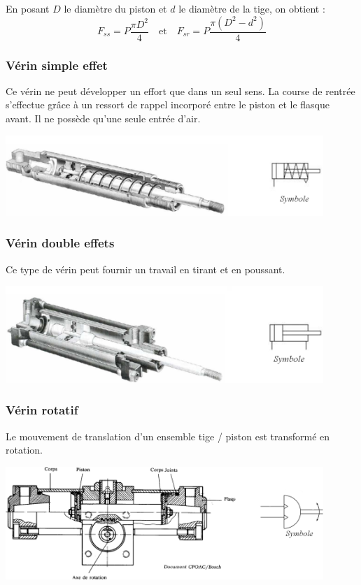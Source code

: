 \documentclass[10pt]{article}
\begin{document}
En posant $D$ le diamètre du piston et $d$ le diamètre de la tige, on obtient : 
$$
F_{ss}=P\dfrac{\pi D^2}{4} \quad \text{et} \quad F_{sr}=P\dfrac{\pi \left(D^2-d^2\right)}{4}
$$


\subsubsection{Vérin simple effet}

Ce vérin ne peut développer un effort que dans un seul sens.
La course de rentrée s’effectue grâce à un ressort de rappel incorporé entre le piston et le flasque avant. Il ne possède qu’une seule entrée d’air.

\begin{center}
\includegraphics[width=12cm]{images/Fig_04_VerinSE}
\end{center}

\subsubsection{Vérin double effets}
Ce type de vérin peut fournir un travail en tirant et en poussant.

\begin{center}
\includegraphics[width=12cm]{images/Fig_05_VerinDE}
\end{center}

\subsubsection{Vérin rotatif}

Le mouvement de translation d’un ensemble tige / piston est transformé en rotation.

\begin{center}
\includegraphics[width=12cm]{images/Fig_06_VerinRot}
\end{center}
\end{document}
